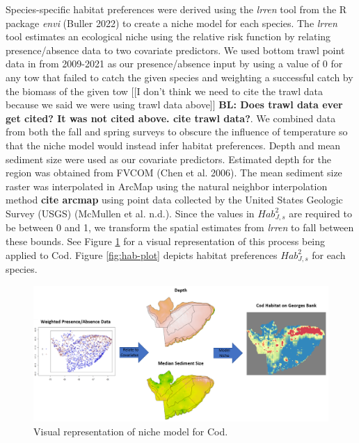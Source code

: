 \documentclass[
  12pt,
]{article}
\begin{document}
Species-specific habitat preferences were derived using the \emph{lrren} tool from the R package \emph{envi} (Buller 2022) to create a niche model for each species. The \emph{lrren} tool estimates an ecological niche using the relative risk function by relating presence/absence data to two covariate predictors. We used bottom trawl point data in from 2009-2021 as our presence/absence input by using a value of 0 for any tow that failed to catch the given species and weighting a successful catch by the biomass of the given tow {[}{[}I don't think we need to cite the trawl data because we said we were using trawl data above{]}{]} \textbf{BL: Does trawl data ever get cited? It was not cited above. cite trawl data?}. We combined data from both the fall and spring surveys to obscure the influence of temperature so that the niche model would instead infer habitat preferences. Depth and mean sediment size were used as our covariate predictors. Estimated depth for the region was obtained from FVCOM (Chen et al. 2006). The mean sediment size raster was interpolated in ArcMap using the natural neighbor interpolation method \textbf{cite arcmap} using point data collected by the United States Geologic Survey (USGS) (McMullen et al. n.d.). Since the values in \(Hab^2_{J,s}\) are required to be between 0 and 1, we transform the spatial estimates from \emph{lrren} to fall between these bounds. See Figure \ref{fig:hab-plot1} for a visual representation of this process being applied to Cod. Figure \ref{fig:hab-plot} depicts habitat preferences \(Hab^2_{J,s}\) for each species.

\begin{figure}

{\centering \includegraphics[width=0.95\linewidth]{Images/hab_snip3} 

}

\caption{Visual representation of niche model for Cod.}\label{fig:hab-plot1}
\end{figure}
\end{document}
